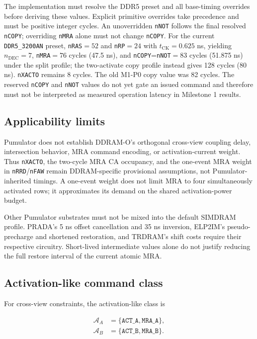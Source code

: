 \documentclass[9pt,twocolumn]{extarticle}
\newcommand{\cmd}[1]{\texttt{#1}}
\newcommand{\param}[1]{\texttt{#1}}
\begin{document}
The implementation must resolve the DDR5 preset and all base-timing overrides
before deriving these values. Explicit primitive overrides take precedence
and must be positive integer cycles. An unoverridden \param{nNOT} follows
the final resolved \param{nCOPY}; overriding \param{nMRA} alone must not
change \param{nCOPY}.
For the current \cmd{DDR5\_3200AN} preset, \param{nRAS}$=52$ and
\param{nRP}$=24$ with $t_{\mathrm{CK}}=0.625$ ns, yielding
$n_{\mathrm{DEC}}=7$, \param{nMRA}$=76$ cycles (47.5 ns), and
\param{nCOPY}=\param{nNOT}$=83$ cycles (51.875 ns) under the split profile;
the two-activate copy profile instead gives 128 cycles (80 ns).
\param{nXACTO} remains 8 cycles. The old M1-P0 copy value was 82 cycles.
The reserved \param{nCOPY} and \param{nNOT} values do not yet gate an issued
command and therefore must not be interpreted as measured operation latency in
Milestone 1 results.

\subsection{Applicability limits}

Pumulator does not establish DDRAM-O's orthogonal cross-view coupling delay,
intersection behavior, MRA command encoding, or activation-current weight.
Thus \param{nXACTO}, the two-cycle MRA CA occupancy, and the one-event MRA
weight in \param{nRRD}/\param{nFAW} remain DDRAM-specific provisional
assumptions, not Pumulator-inherited timings. A one-event weight does not
limit MRA to four simultaneously activated rows; it approximates its demand
on the shared activation-power budget.

Other Pumulator substrates must not be mixed into the default SIMDRAM profile.
PRADA's 5 ns offset cancellation and 35 ns inversion, ELP2IM's
pseudo-precharge and shortened restoration, and TRDRAM's shift costs require
their respective circuitry. Short-lived intermediate values alone do not
justify reducing the full restore interval of the current atomic MRA.

\subsection{Activation-like command class}

For cross-view constraints, the activation-like class is

\begin{align*}
\mathcal{A}_{A} &= \{\cmd{ACT\_A},\cmd{MRA\_A}\},\\
\mathcal{A}_{B} &= \{\cmd{ACT\_B},\cmd{MRA\_B}\}.
\end{align*}
\end{document}
